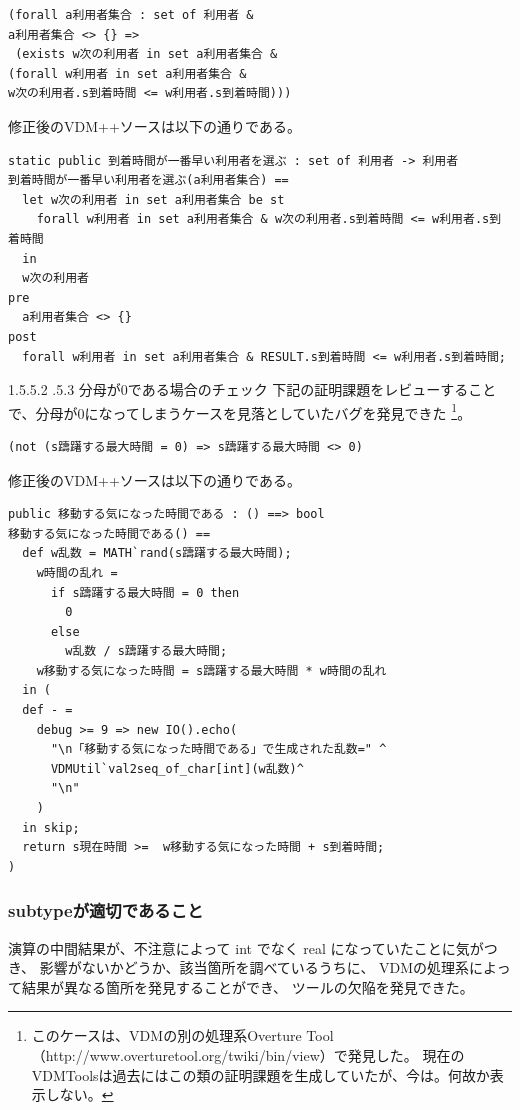 \documentclass[a4paper,8pt]{jsarticle}
\makeatletter
\renewcommand{\paragraph}{\@startsection{paragraph}{4}{\z@}%
  {1.5\Cvs \@plus.5\Cdp \@minus.2\Cdp}%
  {.5\Cvs \@plus.3\Cdp}%
  {\reset@font\normalsize\bfseries}}
\makeatother
\begin{document}
\begin{verbatim}
(forall a利用者集合 : set of 利用者 &
a利用者集合 <> {} =>
 (exists w次の利用者 in set a利用者集合 &
(forall w利用者 in set a利用者集合 &
w次の利用者.s到着時間 <= w利用者.s到着時間)))
  \end{verbatim}
  
  修正後のVDM++ソースは以下の通りである。
  
\begin{verbatim}
static public 到着時間が一番早い利用者を選ぶ : set of 利用者 -> 利用者
到着時間が一番早い利用者を選ぶ(a利用者集合) == 
  let w次の利用者 in set a利用者集合 be st
    forall w利用者 in set a利用者集合 & w次の利用者.s到着時間 <= w利用者.s到着時間
  in
  w次の利用者
pre
  a利用者集合 <> {}
post
  forall w利用者 in set a利用者集合 & RESULT.s到着時間 <= w利用者.s到着時間;
\end{verbatim}

\paragraph{分母が0である場合のチェック}
\label{para:0divide}
下記の証明課題をレビューすることで、分母が0になってしまうケースを見落としていたバグを発見できた
\footnote{このケースは、VDMの別の処理系Overture Tool（http://www.overturetool.org/twiki/bin/view）で発見した。
現在のVDMToolsは過去にはこの類の証明課題を生成していたが、今は。何故か表示しない。}。

\begin{verbatim}
(not (s躊躇する最大時間 = 0) => s躊躇する最大時間 <> 0)
\end{verbatim}

修正後のVDM++ソースは以下の通りである。

\begin{verbatim}
public 移動する気になった時間である : () ==> bool
移動する気になった時間である() == 
  def w乱数 = MATH`rand(s躊躇する最大時間);
    w時間の乱れ = 
      if s躊躇する最大時間 = 0 then
        0
      else
        w乱数 / s躊躇する最大時間;
    w移動する気になった時間 = s躊躇する最大時間 * w時間の乱れ
  in (
  def - = 
    debug >= 9 => new IO().echo(
      "\n「移動する気になった時間である」で生成された乱数=" ^
      VDMUtil`val2seq_of_char[int](w乱数)^
      "\n"
    )
  in skip;
  return s現在時間 >=  w移動する気になった時間 + s到着時間;
)
\end{verbatim}

\subsubsection{subtypeが適切であること}
演算の中間結果が、不注意によって int でなく real になっていたことに気がつき、
影響がないかどうか、該当箇所を調べているうちに、
VDMの処理系によって結果が異なる箇所を発見することができ、
ツールの欠陥を発見できた。
\end{document}
